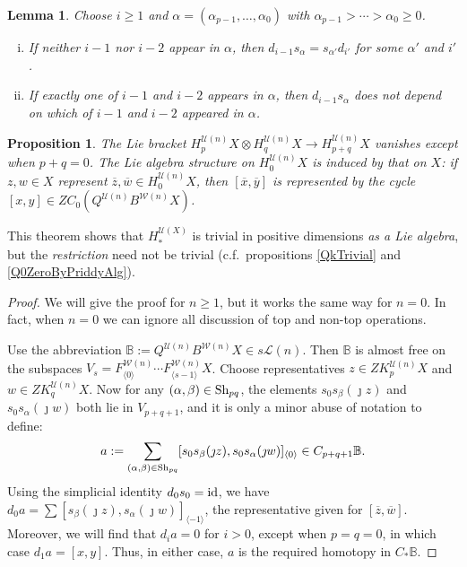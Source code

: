 \documentclass[11pt]{amsart}
\theoremstyle{plain}
\newtheorem{lem}[thm]{Lemma}
\newtheorem{prop}[thm]{Proposition}
\theoremstyle{definition}
\renewcommand{\to}{\longrightarrow}
\newcommand{\squishlist}{
  \setlength{\itemsep}{.5pt}
  \setlength{\parskip}{0pt}
  \setlength{\parsep}{0pt}}
\newcommand{\calU}{\mathcal{U}}
\newcommand{\calL}{\mathcal{L}}
\newcommand{\calw}{\mathcal{W}}
\theoremstyle{plain}
\newcommand{\Shuffles}[2]{\textup{Sh}_{#1#2}}
\newcommand{\Id}{\textup{id}}
\begin{document}
\begin{Koszul complexes}
\begin{lem}\label{LemmaOnSimplicialRelations}
Choose $i\geq1$ and $\alpha=(\alpha_{p-1},\ldots,\alpha_0)$ with $\alpha_{p-1}>\cdots >\alpha_0\geq0$.
\begin{enumerate}[i)]\squishlist
\setlength{\parindent}{.25in}
\item[i)] If neither $i-1$ nor $i-2$ appear in $\alpha$, then  $d_{i-1}s_\alpha=s_{\alpha'}d_{i'}$ for some $\alpha'$ and $i'$.
\item[ii)] If exactly one of $i-1$ and $i-2$ appears in $\alpha$, then  $d_{i-1}s_\alpha$ does not depend on which of $i-1$ and $i-2$ appeared in $\alpha$.
\end{enumerate}
\end{lem}

\begin{prop}\label{LieBracketsTrivial}
The Lie bracket $H_p^{\calU(n)}X\otimes H_q^{\calU(n)}X\to H_{p+q}^{\calU(n)}X$ vanishes except when $p+q=0$. 
The Lie algebra structure on $H_0^{\calU(n)}X$ is induced by that on $X$: if $z,w\in X$ represent $\overline{z},\overline{w}\in H_0^{\calU(n)}X$, then $[\overline{x},\overline{y}]$ is represented by the cycle $[x,y]\in ZC_0(Q^{\calU(n)}B^{\calw(n)}X)$.
\end{prop}
\noindent This theorem shows that $H_*^{\calU(X)}$ is trivial in positive dimensions \emph{as a Lie algebra}, but the \emph{restriction} need not be trivial (c.f.\ propositions \ref{QkTrivial} and \ref{Q0ZeroByPriddyAlg}).
\begin{proof}
We will give the proof for $n\geq1$, but it works the same way for $n=0$. In fact, when $n=0$ we can ignore all discussion of top and non-top operations.

Use the abbreviation $\mathbb{B}:=Q^{\calU(n)}B^{\calw(n)}X\in s\calL(n)$. Then $\mathbb{B}$ is almost free on the subspaces $V_s=F^{\calw(n)}_{\langle 0\rangle}\cdots F^{\calw(n)}_{\langle s-1\rangle}X$. Choose representatives $z\in ZK_p^{\calU(n)}X$ and $w\in ZK_q^{\calU(n)}X$. Now  for any $(\alpha,\beta)\in\Shuffles{p}{q}$, the elements $s_{0}s_\beta(\jmath z)$ and $s_{0}s_\alpha(\jmath w)$ both lie in $V_{p+q+1}$, and it is only a minor abuse of notation to define:
\[a:=\sum_{(\alpha,\beta)\in\Shuffles{p}{q}}[s_{0}s_\beta(\jmath z), s_{0}s_\alpha(\jmath w)]_{\langle 0\rangle}\in C_{p+q+1}\mathbb{B}.\]
Using the simplicial identity $d_0s_0=\Id$, we have $d_{0}a=\sum [s_\beta(\jmath z), s_\alpha(\jmath w)]_{\langle -1\rangle}$, the representative given for $[\overline{z},\overline{w}]$. Moreover, we will find that $d_ia=0$ for $i>0$, except when $p=q=0$, in which case $d_1a=[x,y]$. Thus, in either case, $a$ is the required homotopy in $C_*\mathbb{B}$.


\end{proof}
\end{Koszul complexes}
\end{document}
